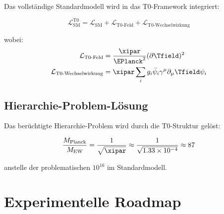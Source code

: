 	Das vollständige Standardmodell wird in das T0-Framework integriert:
	
	\begin{equation}
		\mathcal{L}_{\text{SM}}^{\text{T0}} = \mathcal{L}_{\text{SM}} + \mathcal{L}_{\text{T0-Feld}} + \mathcal{L}_{\text{T0-Wechselwirkung}}
	\end{equation}
	
	wobei:
	\begin{align}
		\mathcal{L}_{\text{T0-Feld}} &= \frac{\xipar}{\EPlanck^2} (\partial \Tfield)^2 \\
		\mathcal{L}_{\text{T0-Wechselwirkung}} &= \xipar \sum_i g_i \bar{\psi}_i \gamma^\mu \partial_\mu \Tfield \psi_i
	\end{align}
	
	\subsection{Hierarchie-Problem-Lösung}
	
	Das berüchtigte Hierarchie-Problem wird durch die T0-Struktur gelöst:
	
	\begin{equation}
		\frac{M_{\text{Planck}}}{M_{\text{EW}}} = \frac{1}{\sqrt{\xipar}} \approx \frac{1}{\sqrt{1.33 \times 10^{-4}}} \approx 87
	\end{equation}
	
	anstelle der problematischen $10^{16}$ im Standardmodell.
	
	\section{Experimentelle Roadmap}
	
	\begin{table}[htbp]
		\centering
		\caption{Experimentelle Tests für T0-QFT und QM}
		\label{tab:t0_experimental_tests}
	\end{table}
	
